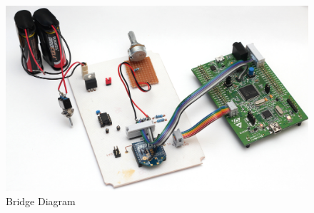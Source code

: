 \begin{figure}[H]
\begin{center}
\includegraphics[width=12cm]{images/photos/edited/scale1}
\end{center}
\caption{Bridge Diagram}
\label{fig:Bridge Diagram}
\end{figure}
